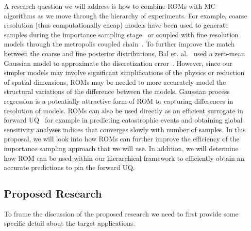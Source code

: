 \documentclass[11pt]{article}
\begin{document}
A research question we will address is how to combine ROMs with MC algorithms as we move through the hierarchy of experiments.
For example, coarse resolution (thus computationally cheap) models have been used to generate  samples
during the importance sampling stage~\cite{Higdon:2002vx,Christen:2005wp,Efendiev:2007uw,Bal:2013tp} or
coupled with fine resolution models through the metropolis coupled chain~\cite{Higdon:2002vx}.
To further improve the match between the coarse and fine posterior distributions, Bal et. al.~\cite{Bal:2013tp} used
a zero-mean Gaussian model to approximate the discretization error~\cite{Kaipio:2007ux}.
However, since our simpler models may involve significant simplifications of the physics or reduction of spatial dimensions,
ROMs may be needed to more accurately model the structural variations of the difference between the models. 
Gaussian process regression is a potentially attractive form of ROM to capturing differences in resolution of models.  
ROMs can also be used directly as an efficient surrogate in forward UQ~\cite{Challenor:2012uv, Ratto:2012tf} for example in predicting catastrophic events and obtaining global sensitivity analyses indices that converges slowly with number of samples.   In this proposal, we will look into how ROMs can further improve the efficiency of the importance sampling approach that we will use.  In addition, we will determine how ROM can be used within our hierarchical framework to efficiently obtain an accurate predictions to pin the forward UQ.

\subsection*{Proposed Research}

To frame the discussion of the proposed research we need to first provide some specific detail
about the target applications.
\end{document}
